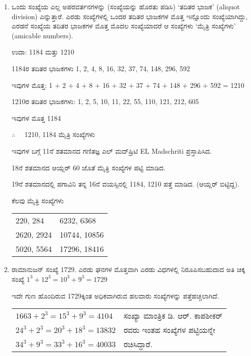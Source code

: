 \begin{enumerate}
\item ಒಂದು ಸಂಖ್ಯೆಯ ಎಲ್ಲ ಅಪರವರ್ತನಗಳನ್ನು (ಸಂಖ್ಯೆಯನ್ನು ಹೊರತು ಪಡಿಸಿ) `ತದಿತರ ಭಾಜಕ' (aliquot division) ಎನ್ನುತ್ತಾರೆ. ಎರಡು ಸಂಖ್ಯೆಗಳಲ್ಲಿ ಒಂದರ ತದಿತರ ಭಾಜಕಗಳ ಮೊತ್ತ ಇನ್ನೊಂದು ಸಂಖ್ಯೆಯಾಗಿದ್ದು, ಎರಡನೆ ಸಂಖ್ಯೆಯ ತದಿತರ ಭಾಜಕಗಳ ಮೊತ್ತ ಮೊದಲ ಸಂಖ್ಯೆಯಾದರೆ ಆ ಸಂಖ್ಯೆಗಳು `ಮೈತ್ರಿ ಸಂಖ್ಯೆಗಳು' (amicable numbers). 

ಉದಾ: 1184 ಮತ್ತು 1210

1184ರ ತದಿತರ ಭಾಜಕಗಳು 1, 2, 4, 8, 16, 32, 37, 74, 148, 296, 592

ಇವುಗಳ ಮೊತ್ತ: 1 $+$ 2 $+$ 4 $+$ 8 $+$ 16 $+$ 32 $+$ 37 $+$ 74 $+$ 148 $+$ 296 $+$ 592 = 1210

1210ರ ತದಿತರ ಭಾಜಕಗಳು: 1, 2, 5, 10, 11, 22, 55, 110, 121, 212, 605

ಇವುಗಳ ಮೊತ್ತ 1184 

$\therefore\quad$ 1210, 1184 ಮೈತ್ರಿ ಸಂಖ್ಯೆಗಳು 

ಇವುಗಳ ಬಗ್ಗೆ 11ನೆ ಶತಮಾನದ ಗಣಿತಜ್ಞ ಎಲ್ ಮದ್‌ಷ್ರಿಟಿ EL Madschriti ಪ್ರಸ್ತಾಪಿಸಿದ. 

18ನೆ ಶತಮಾನದ ಆಯ್ಲರ್ 60 ಜೊತೆ ಮೈತ್ರಿ ಸಂಖ್ಯೆಗಳ ಪಟ್ಟಿ ಮಾಡಿದ. 

19ನೆ ಶತಮಾನದಲ್ಲಿ ಪಗಾವಿನಿ ತನ್ನ 16ನೆ ವಯಸ್ಸಿನಲ್ಲಿ 1184, 1210 ಪತ್ತೆ ಮಾಡಿದ. (ಆಯ್ಲರ್ ಬಿಟ್ಟಿದ್ದ). 

ಕೆಲವು ಮೈತ್ರಿ ಸಂಖ್ಯೆಗಳು 

\begin{tabular}[t]{ll}
220, 284 & 6232, 6368\\
2620, 2924 & 10744, 10856\\
5020, 5564 & 17296, 18416
\end{tabular}

\item ರಾಮಾನುಜನ್ ಸಂಖ್ಯೆ  1729. ಎರಡು ಘನಗಳ ಮೊತ್ತವಾಗಿ ಎರಡು ವಿಧಗಳಲ್ಲಿ ನಿರೂಪಿಸಬಹುದಾದ ಅತಿ ಚಿಕ್ಕ ಸಂಖ್ಯೆ  $1^{3} + 12^{3} = 10^{3} + 9^{3} = 1729$

ಇದೇ ಗುಣ ಹೊಂದಿರುವ 1729ಕ್ಕಿಂತ ಅಧಿಕವಾಗಿರುವ ಹಲವಾರು ಸಂಖ್ಯೆಗಳನ್ನು ಪತ್ತೆಹಚ್ಚಲಾಗಿದೆ. 

\begin{tabular}[t]{ll}
$166{3} + 2^{3} = 15^{3} + 9^{3} = 4104$ & ಸಂಖ್ಯಾ ಮಾಂತ್ರಿಕ ಡಿ. ಆರ್. ಕಾಪಶೀಕರ್\\
$24^{3} + 2^{3} = 20^{3} + 18^{3} = 13832$& ರವರು ಇಂತಹ ಸಂಖ್ಯೆಗಳ ಪಟ್ಟಿಯನ್ನೇ\\
$34^{3} + 9^{3} = 33^{3} + 16^{3} = 40033$ & ರಚಿಸಿದ್ದಾರೆ. 
\end{tabular}


\end{enumerate}
